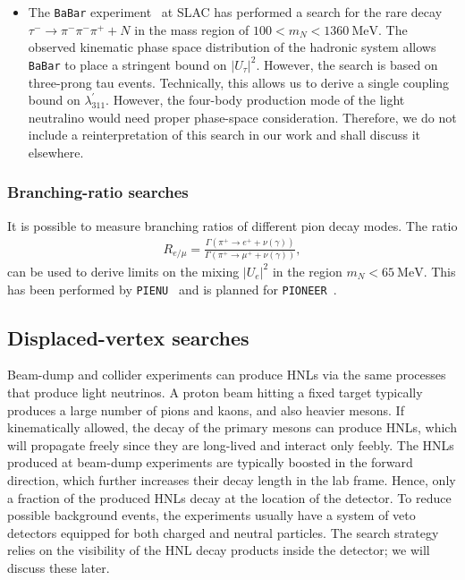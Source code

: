 \begin{itemize}
 



\item The \texttt{BaBar} experiment~\cite{BaBar:2022cqj}  at SLAC has performed a search for the rare decay  
$\tau^- \to \pi^- \pi^- \pi^+ + N$ in the mass region of $100 < m_N < \SI{1360}{\MeV}$. The observed kinematic phase 
space distribution of the hadronic system allows \texttt{BaBar} to place a stringent bound on $|U_\tau|^2$. However, the 
search is based on three-prong tau events. Technically, this allows us to derive a single coupling bound on $\lambda^
\prime_{311}$. However, the four-body production mode of the light neutralino would need proper phase-space 
consideration. Therefore, we do not include a reinterpretation of this search in our work and shall discuss it
elsewhere.

\end{itemize}



\subsubsection{Branching-ratio searches}
%
%
It is possible to measure branching ratios of different pion decay modes. The ratio 
\begin{align}
R_{e/\mu} = \frac{\Gamma\left(\pi^+ \to e^+ + \nu(\gamma)\right)}{\Gamma\left(\pi^+ \to \mu^+ + \nu(\gamma)\right)},
\end{align}
can be used to derive limits on the mixing $|U_e|^2$ in the region $m_N<\SI{65}{\MeV}$.
This has been performed by \texttt{PIENU}~\cite{PiENu:2015seu} and is planned for \texttt{PIONEER}~\cite{PIONEER:2022alm}.




\subsection{Displaced-vertex searches}
Beam-dump and collider experiments can produce HNLs via the same processes that produce light neutrinos. A proton beam 
hitting a fixed target typically produces a large number of pions and kaons, and also heavier mesons. If kinematically 
allowed, the decay of the primary mesons can produce HNLs, which will propagate freely since they are long-lived and 
interact only feebly. The HNLs produced at beam-dump experiments are typically boosted in the forward direction, which 
further increases their decay length in the lab frame. Hence, only a fraction of the produced HNLs decay at the location 
of the detector. To reduce possible background events, the experiments usually have a system of veto detectors equipped 
for both charged and neutral particles. The search strategy relies on the visibility of the HNL decay products inside 
the detector; we will discuss these later.

